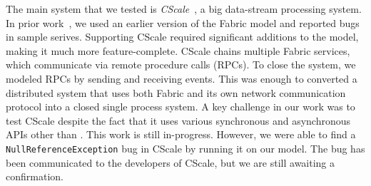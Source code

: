 
The main system that we tested is \emph{CScale}~\cite{faleiro2012},
a big data-stream processing system. In prior work~\cite{deligiannis2015psharp}, 
we used an earlier version of the Fabric model and reported bugs in sample serives.
Supporting CScale required significant additions to the model, making it much more
feature-complete.
CScale chains multiple Fabric services, which communicate via remote procedure calls (RPCs).
To close the system, we modeled RPCs 
by sending and receiving \psharp{} events.
This was enough to converted a distributed system
that uses both Fabric and its own
network communication protocol
into 
a closed single process system. 
A key challenge in our work
was to test CScale despite the fact that it
uses various synchronous and asynchronous APIs
other than \psharp{}.
This work is still in-progress.
However, we were able to find a \texttt{NullReferenceException}
bug in CScale by running it on our model. The bug has been
communicated to the developers of CScale, but we are still awaiting a
confirmation.











